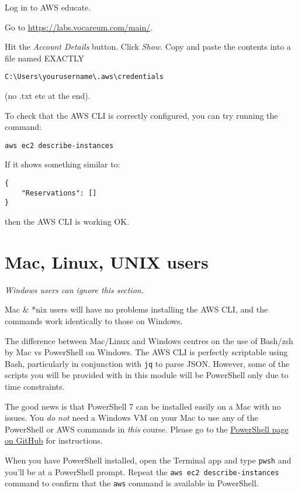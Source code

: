 \documentclass{pgnotes}
\begin{document}
Log in to AWS educate.

Go to \url{https://labs.vocareum.com/main/}.

Hit the \textit{Account Details} button.
Click \textit{Show}.
Copy and paste the contents into a file named EXACTLY 
\begin{verbatim}
C:\Users\yourusername\.aws\credentials
\end{verbatim}
(no .txt etc at the end). 



To check that the AWS CLI is correctly configured, you can try running the command:
\begin{verbatim}
aws ec2 describe-instances
\end{verbatim}
If it shows something similar to:
\begin{verbatim}
{
    "Reservations": []
}
\end{verbatim}
then the AWS CLI is working OK.

\section{Mac, Linux, UNIX users}

\textit{Windows users can ignore this section.}

Mac \& *nix users will have no problems installing the AWS CLI, and the commands work identically to those on Windows.

The difference between Mac/Linux and Windows centres on the use of Bash/zsh by Mac vs PowerShell on Windows.
The AWS CLI is perfectly scriptable using Bash, particularly in conjunction with \texttt{jq} to parse JSON.
However, some of the scripts you will be provided with in this module will be PowerShell only due to time constraints.

The good news is that PowerShell 7 can be installed easily on a Mac with no issues.
You \textit{do not} need a Windows VM on your Mac to use any of the PowerShell or AWS commands in \textit{this} course.
Please go to the \href{https://github.com/PowerShell/PowerShell}{PowerShell page on GitHub} for instructions.

When you have PowerShell installed, open the Terminal app and type \texttt{pwsh} and you'll be at a PowerShell prompt.
Repeat the \texttt{aws ec2 describe-instances} command to confirm that the \texttt{aws} command is available in PowerShell. 
\end{document}
